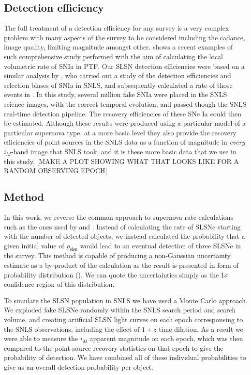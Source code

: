 \subsection{Detection efficiency}
The full treatment of a detection efficiency for any survey is a very complex problem with many aspects of the survey to be considered including the cadance, image quality, limiting magnitude amongst other. \citet{Frohmaier2017} shows a recent examples of such comprehensive study performed with the aim of calculating the local volumetric rate of SNIa in PTF. Our SLSN detection efficiencies were based on a similar analysis by \citet{Perrett2010}, who carried out a study of the detection efficiencies and selection biases of SNIa in SNLS, and subsequently calculated a rate of those events in \cite{Perrett2012}. In this study, several million fake SNIa were placed in the SNLS science images, with the correct temporal evolution, and passed though the SNLS real-time detection pipeline. The recovery efficiencies of these SNe Ia could then be estimated. Although these results were produced using a particular model of a particular supernova type, at a more basic level they also provide the recovery efficiencies of point sources in the SNLS data as a function of magnitude in \textit{every} $i_M$-band image that SNLS took, and it is these more basic data that we use in this study. [MAKE A PLOT SHOWING WHAT THAT LOOKS LIKE FOR A RANDOM OBSERVING EPOCH]

\subsection{Method}
In this work, we reverse the common approach to supernova rate calculations such as the ones used by \citet{Perrett2012} and \citep{Frohmaier2017}. Instead of calculating the rate of SLSNe starting with the number of detected objects, we instead calculated the probability that a given initial value of $\rho_{\mathrm{slsn}}$ would lead to an eventual detection of three SLSNe in the survey. This method is capable of producing a non-Gaussian uncertainty estimate as a by-product of the calculation as the result is presented in form of probability distribution (). We can quote the uncertainties simply as the 1$\sigma$ confidence region of this distribution.

To simulate the SLSN population in SNLS we have used a Monte Carlo approach. We exploded fake SLSNe randomly within the SNLS search period and search volume, and creating artificial SLSN light curves on each epoch corresponsing to the SNLS observations, including the effect of $1+z$ time dilation. As a result we were able to measure the $i_M$ apparent magnitude on each epoch, which was then compared to the point-source recovery statistics on that epoch to give the probability of detection. We have combined all of these individual probabilities to give us an overall detection probability per object.

